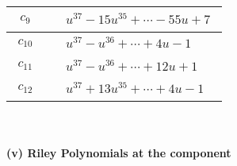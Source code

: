 \documentclass[1p]{elsarticle_modified}
\theoremstyle{definition}
\begin{document}
\begin{tabular}{m{50pt}|m{274pt}}
\hline $$\begin{aligned}c_{9}\end{aligned}$$&$\begin{aligned}
&u^{37}-15 u^{35}+\cdots-55 u+7
\end{aligned}$\\
\hline $$\begin{aligned}c_{10}\end{aligned}$$&$\begin{aligned}
&u^{37}- u^{36}+\cdots+4 u-1
\end{aligned}$\\
\hline $$\begin{aligned}c_{11}\end{aligned}$$&$\begin{aligned}
&u^{37}- u^{36}+\cdots+12 u+1
\end{aligned}$\\
\hline $$\begin{aligned}c_{12}\end{aligned}$$&$\begin{aligned}
&u^{37}+13 u^{35}+\cdots+4 u-1
\end{aligned}$\\
\hline
\end{tabular}\\~\\
\newpage\renewcommand{\arraystretch}{1}
\flushleft \textbf{(v) Riley Polynomials at the component}\newline \\
\end{document}
